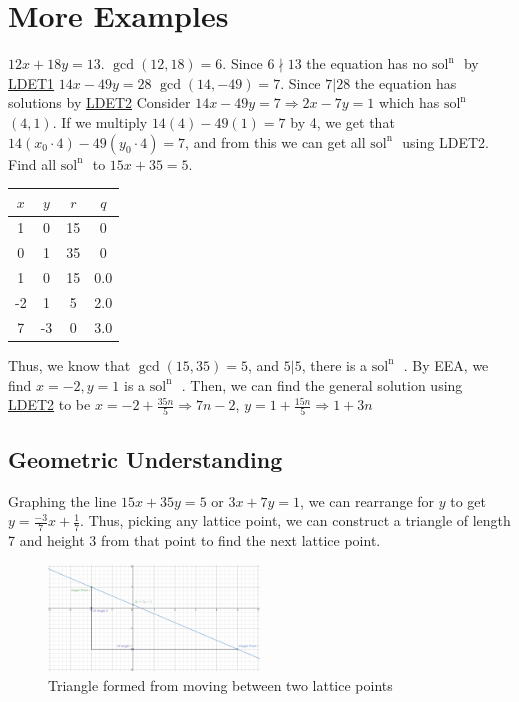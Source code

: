 \documentclass[oneside]{book}
\newcommand\tab[1][1cm]{\hspace*{#1}}
\newcommand\nextline{\newline\tab}
\newcommand\soln{$\text{sol}^\text{n}\text{ }$}
\begin{document}
\section{More Examples}
$12x+18y=13$.
\nextline
$\gcd(12,18) = 6$. Since $6\nmid13$ the equation has no \soln by \hyperref[sec:ldeta]{LDET1}
\newline
\newline
$14x-49y=28$
\nextline
$\gcd(14,-49) = 7$. Since $7\lvert 28$ the equation has solutions by \hyperref[sec:ldetb]{LDET2}
\nextline
Consider $14x-49y=7\Rightarrow 2x-7y=1$ which has \soln $(4,1)$. If we multiply $14(4) - 49(1) = 7$ by 4, we get that $14(x_0\cdot4) - 49(y_0\cdot4) = 7$, and from this we can get all \soln using LDET2.
\newline
\newline
\tab
Find all \soln to $15x+35=5$.
\newline
\begin{center}
\begin{tabular}{|c|c|c|c|}
\hline
$x$ & $y$ & $r$ & $q$ \\
\hline
\hline
1 & 0 & 15 & 0 \\
0 & 1 & 35 & 0 \\
1 & 0 & 15 & 0.0 \\
-2 & 1 & 5 & 2.0 \\
7 & -3 & 0 & 3.0 \\
\hline
\end{tabular}
\end{center}
\tab
Thus, we know that $\gcd(15,35)=5$, and $5\lvert 5$, there is a \soln. By EEA, we find $x=-2, y=1$ is a \soln. Then, we can find the general solution using
\hyperref[sec:ldetb]{LDET2}
 to be $x=-2+\frac{35n}{5}\Rightarrow 7n-2$, $y=1+\frac{15n}{5}\Rightarrow 1+3n$
\subsection{Geometric Understanding}
\tab
Graphing the line $15x+35y=5$ or $3x+7y=1$, we can rearrange for $y$ to get $y=\frac{-3}{7}x+\frac{1}{7}$. Thus, picking any lattice point, we can construct a triangle of length 7 and height 3 from that point to find the next lattice point.

\begin{figure}[h]
\centering
\includegraphics[width=0.5\textwidth]{l24f0}
\caption{Triangle formed from moving between two lattice points}
\end{figure}
\end{document}
